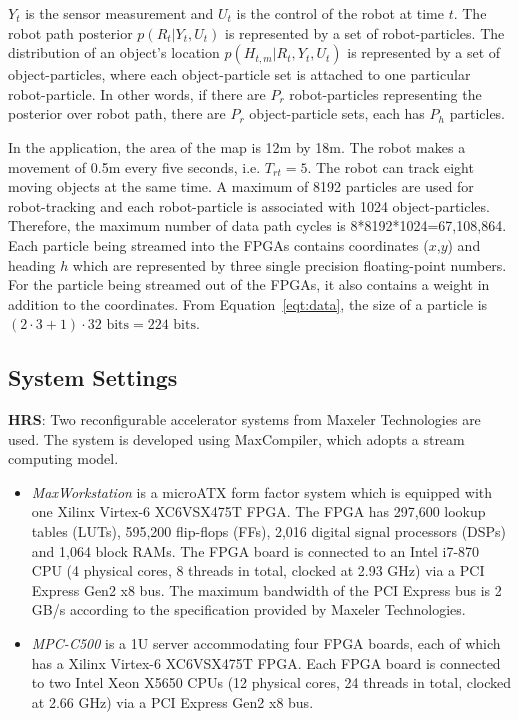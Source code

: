 $Y_t$ is the sensor measurement and $U_t$ is the control of the robot at time $t$.
The robot path posterior $p(R_t|Y_t,U_t)$ is represented by a set of robot-particles.
The distribution of an object's location $p(H_{t,m}|R_t,Y_t,U_t)$ is represented by a set of object-particles, where each object-particle set is attached to one particular robot-particle.
In other words, if there are $P_r$ robot-particles representing the posterior over robot path, there are $P_r$ object-particle sets, each has $P_h$ particles.

In the application, the area of the map is 12m by 18m.
The robot makes a movement of 0.5m every five seconds, i.e. $T_{rt} = 5$.
The robot can track eight moving objects at the same time.
A maximum of 8192 particles are used for robot-tracking and each robot-particle is associated with 1024 object-particles.
Therefore, the maximum number of data path cycles is 8*8192*1024=67,108,864.
Each particle being streamed into the FPGAs contains coordinates ($x$,$y$) and heading $h$ which are represented by three single precision floating-point numbers.
For the particle being streamed out of the FPGAs, it also contains a weight in addition to the coordinates.
From Equation~\ref{eqt:data}, the size of a particle is $(2 \cdot 3 + 1) \cdot 32 \mbox{ bits} = 224 \mbox{ bits}$.

\subsection{System Settings}

\textbf{HRS}: Two reconfigurable accelerator systems from Maxeler Technologies are used.
The system is developed using MaxCompiler, which adopts a stream computing model.
\begin{itemize}
\item \textit{MaxWorkstation} is a microATX form factor system which is equipped with one Xilinx Virtex-6 XC6VSX475T FPGA.
The FPGA has 297,600 lookup tables (LUTs), 595,200 flip-flops (FFs), 2,016 digital signal processors (DSPs) and 1,064 block RAMs. 
The FPGA board is connected to an Intel i7-870 CPU (4 physical cores, 8 threads in total, clocked at 2.93 GHz) via a PCI Express Gen2 x8 bus.
The maximum bandwidth of the PCI Express bus is 2 GB/s according to the specification provided by Maxeler Technologies.
\item \textit{MPC-C500} is a 1U server accommodating four FPGA boards, each of which has a Xilinx Virtex-6 XC6VSX475T FPGA.
Each FPGA board is connected to two Intel Xeon X5650 CPUs (12 physical cores, 24 threads in total, clocked at 2.66 GHz) via a PCI Express Gen2 x8 bus.
\end{itemize}

